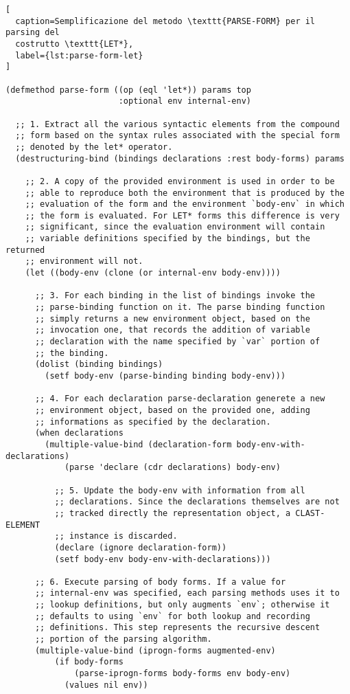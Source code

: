 \begin{lstlisting}[
  caption=Semplificazione del metodo \texttt{PARSE-FORM} per il parsing del
  costrutto \texttt{LET*},
  label={lst:parse-form-let}
]

(defmethod parse-form ((op (eql 'let*)) params top
                       :optional env internal-env)

  ;; 1. Extract all the various syntactic elements from the compound
  ;; form based on the syntax rules associated with the special form
  ;; denoted by the let* operator.
  (destructuring-bind (bindings declarations :rest body-forms) params

    ;; 2. A copy of the provided environment is used in order to be
    ;; able to reproduce both the environment that is produced by the
    ;; evaluation of the form and the environment `body-env` in which
    ;; the form is evaluated. For LET* forms this difference is very
    ;; significant, since the evaluation environment will contain
    ;; variable definitions specified by the bindings, but the returned
    ;; environment will not.
    (let ((body-env (clone (or internal-env body-env))))

      ;; 3. For each binding in the list of bindings invoke the
      ;; parse-binding function on it. The parse binding function
      ;; simply returns a new environment object, based on the
      ;; invocation one, that records the addition of variable
      ;; declaration with the name specified by `var` portion of
      ;; the binding.
      (dolist (binding bindings)
        (setf body-env (parse-binding binding body-env)))

      ;; 4. For each declaration parse-declaration generete a new
      ;; environment object, based on the provided one, adding
      ;; informations as specified by the declaration.
      (when declarations
        (multiple-value-bind (declaration-form body-env-with-declarations)
            (parse 'declare (cdr declarations) body-env)

          ;; 5. Update the body-env with information from all
          ;; declarations. Since the declarations themselves are not
          ;; tracked directly the representation object, a CLAST-ELEMENT
          ;; instance is discarded.
          (declare (ignore declaration-form))
          (setf body-env body-env-with-declarations)))

      ;; 6. Execute parsing of body forms. If a value for
      ;; internal-env was specified, each parsing methods uses it to
      ;; lookup definitions, but only augments `env`; otherwise it
      ;; defaults to using `env` for both lookup and recording
      ;; definitions. This step represents the recursive descent
      ;; portion of the parsing algorithm.
      (multiple-value-bind (iprogn-forms augmented-env)
          (if body-forms
              (parse-iprogn-forms body-forms env body-env)
            (values nil env))


\end{lstlisting}
